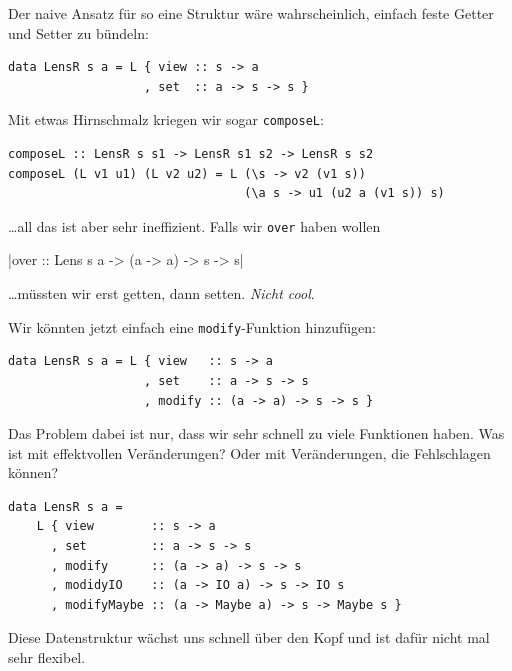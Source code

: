 \documentclass{beamer}
\begin{document}

\begin{frame}[fragile]

Der naive Ansatz für so eine Struktur wäre wahrscheinlich, einfach feste Getter und Setter zu bündeln:

\begin{verbatim}
data LensR s a = L { view :: s -> a
                   , set  :: a -> s -> s }
\end{verbatim}
\pause

Mit etwas Hirnschmalz kriegen wir sogar \texttt{composeL}:

\begin{verbatim}
composeL :: LensR s s1 -> LensR s1 s2 -> LensR s s2
composeL (L v1 u1) (L v2 u2) = L (\s -> v2 (v1 s))
                                 (\a s -> u1 (u2 a (v1 s)) s) 
\end{verbatim}
\pause
\dots all das ist aber sehr ineffizient. Falls wir \texttt{over} haben wollen

|over :: Lens s a -> (a -> a) -> s -> s|

\dots müssten wir erst getten, dann setten. \emph{Nicht cool}.

\end{frame}


\begin{frame}[fragile]

Wir könnten jetzt einfach eine \texttt{modify}-Funktion hinzufügen:

\begin{verbatim}
data LensR s a = L { view   :: s -> a
                   , set    :: a -> s -> s 
                   , modify :: (a -> a) -> s -> s }
\end{verbatim}
\pause

Das Problem dabei ist nur, dass wir sehr schnell zu viele Funktionen haben. Was ist mit
effektvollen Veränderungen? Oder mit Veränderungen, die Fehlschlagen können?
\pause

\begin{verbatim}
data LensR s a =
    L { view        :: s -> a
      , set         :: a -> s -> s 
      , modify      :: (a -> a) -> s -> s 
      , modidyIO    :: (a -> IO a) -> s -> IO s
      , modifyMaybe :: (a -> Maybe a) -> s -> Maybe s }
\end{verbatim}

Diese Datenstruktur wächst uns schnell über den Kopf und ist dafür nicht mal sehr flexibel.

\end{frame}
\end{document}
